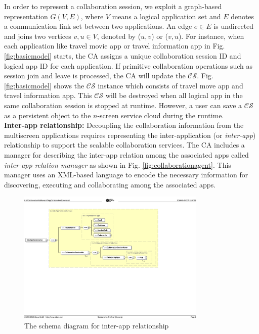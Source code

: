 \documentclass[conference]{IEEEtran}
\begin{document}
In order to represent a collaboration session, we exploit a graph-based representation $G(V, E)$, where $V$ means a logical application set and $E$ denotes a communication link set between two applications. An edge $e \in E$ is undirected and joins two vertices $v, u \in V$, denoted by ($u, v$) or ($v, u$). 
For instance, when each application like travel movie app or travel information app in Fig. \ref{fig:basicmodel} starts, the CA assigns a unique collaboration session ID and logical app ID for each application. If primitive collaboration operations such as session join and leave is processed, the CA will update the $\mathcal{CS}$. Fig. \ref{fig:basicmodel} shows the  $\mathcal{CS}$ instance which consists of travel move app and travel information app. This $\mathcal{CS}$ will be destroyed when all logical app in the same collaboration session is stopped at runtime. However, a user can save a $\mathcal{CS}$ as a persistent object to the $n$-screen service cloud during the runtime.\\

\noindent
\textbf{Inter-app relationship:}
Decoupling the collaboration information from the multiscreen applications requires representing the inter-application (or \textit{inter-app}) relationship to support the scalable collaboration services. The CA includes a manager for describing the inter-app relation among the associated apps called \textit{inter-app relation manager} as shown in Fig. \ref{fig:collaborationagent}. This manager uses an XML-based language to encode the necessary information for discovering, executing and collaborating among the associated apps. 

\begin{figure}[htb] %
\centering
\includegraphics[width=9cm,keepaspectratio]{interapprelationscheme}
\caption{The schema diagram for inter-app relationship}
\label{fig:interapprelation}
\end{figure}
\end{document}
